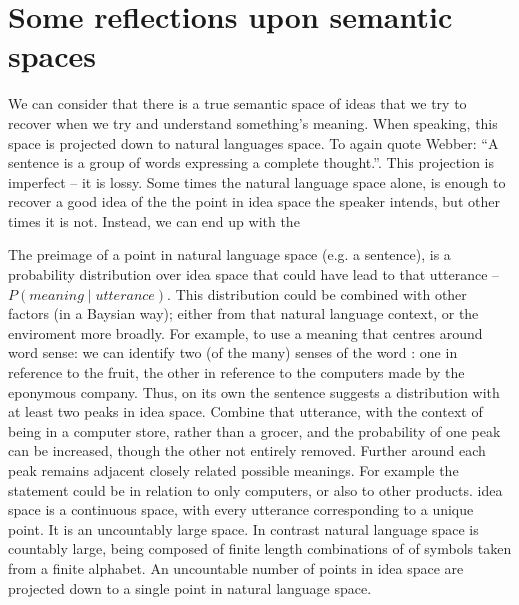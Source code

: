 \documentclass{book}
\begin{document}
\section{Some reflections upon semantic spaces}
\begin{figure}
\end{figure}

We can consider that there is a true semantic space of ideas that we try to recover when we try and understand something's meaning.
When speaking, this space is projected down to natural languages space.
To again quote Webber: ``A sentence is a group of words expressing a complete thought.''.
This projection is imperfect -- it is lossy.
Some times the natural language space alone, is enough to recover a good idea of the the point in idea space the speaker intends,
but other times it is not.
Instead, we can end up with the 


The preimage of a point in natural language space (e.g. a sentence),
is a probability distribution over idea space that could have lead to that utterance -- $P(meaning \mid utterance)$.
This distribution could be combined with other factors (in a Baysian way); either from that natural language context, or the enviroment more broadly.
For example, to use a meaning that centres around word sense:
we can identify two (of the many) senses of the word :
one in reference to the fruit, the other in reference to the computers made by the eponymous company.
Thus, on its own the sentence 
suggests a distribution with at least two peaks in idea space.
Combine that utterance, with the context of being in a computer store, rather than a grocer, and the probability of one peak can be increased, though  the other not entirely removed.
Further around each peak remains adjacent closely related possible meanings.
For example the statement could be in relation to only computers, or also to other products.
idea space is a continuous space, with every utterance corresponding to a unique point. It is an uncountably large space.
In contrast natural language space is countably large, being composed of finite length combinations of of symbols taken from a finite alphabet.
An uncountable number of points in idea space are projected down to a single point in natural language space.
\end{document}
